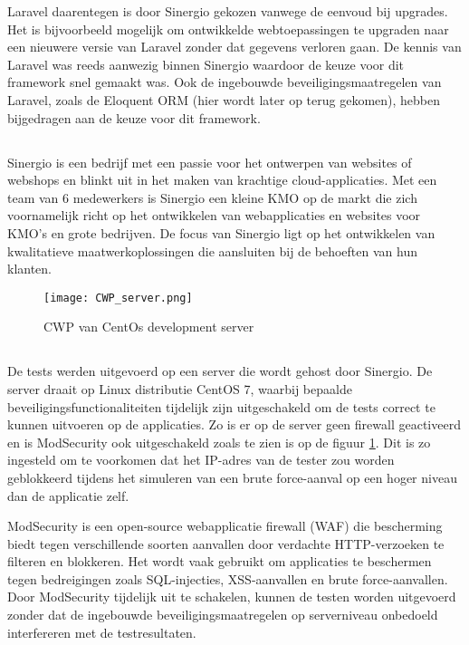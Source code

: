 Laravel daarentegen is door Sinergio gekozen vanwege de eenvoud bij upgrades. Het is bijvoorbeeld mogelijk om ontwikkelde webtoepassingen 
te upgraden naar een nieuwere versie van Laravel zonder dat gegevens verloren gaan. De kennis van Laravel was 
reeds aanwezig binnen Sinergio waardoor de keuze voor dit framework snel gemaakt was. Ook de ingebouwde beveiligingsmaatregelen 
van Laravel, zoals de Eloquent ORM (hier wordt later op terug gekomen), hebben bijgedragen aan de keuze voor dit framework.

\subsection{}
Sinergio is een bedrijf met een passie voor het ontwerpen van websites of webshops en blinkt 
uit in het maken van krachtige cloud-applicaties. Met een team van 6 medewerkers is Sinergio een kleine KMO op de markt 
die zich voornamelijk richt op het ontwikkelen van webapplicaties en websites voor KMO's en grote bedrijven. De focus 
van Sinergio ligt op het ontwikkelen van kwalitatieve maatwerkoplossingen die aansluiten bij de behoeften van hun klanten.

\begin{figure}
    \centering
    \texttt{[image: CWP\_server.png]}
    \caption[CWP van CentOs development server]{CWP van CentOs development server}
    \label{fig:centos_server}
\end{figure}
\subsection{}
De tests werden uitgevoerd op een server die wordt gehost door Sinergio. De server draait op Linux distributie CentOS 7, waarbij bepaalde 
beveiligingsfunctionaliteiten tijdelijk zijn uitgeschakeld om de tests correct te kunnen uitvoeren op de applicaties. Zo is er op de server 
geen firewall geactiveerd en is ModSecurity ook uitgeschakeld zoals te zien is op de figuur \ref{fig:centos_server}. Dit is 
zo ingesteld om te voorkomen dat het IP-adres van de tester zou worden geblokkeerd tijdens het simuleren van een brute 
force-aanval op een hoger niveau dan de applicatie zelf.

ModSecurity is een open-source webapplicatie firewall (WAF) die bescherming biedt tegen verschillende soorten aanvallen door 
verdachte HTTP-verzoeken te filteren en blokkeren. Het wordt vaak gebruikt om applicaties te beschermen tegen bedreigingen 
zoals SQL-injecties, XSS-aanvallen en brute force-aanvallen. Door ModSecurity tijdelijk uit te schakelen, kunnen de testen 
worden uitgevoerd zonder dat de ingebouwde beveiligingsmaatregelen op serverniveau onbedoeld interfereren met de testresultaten.

